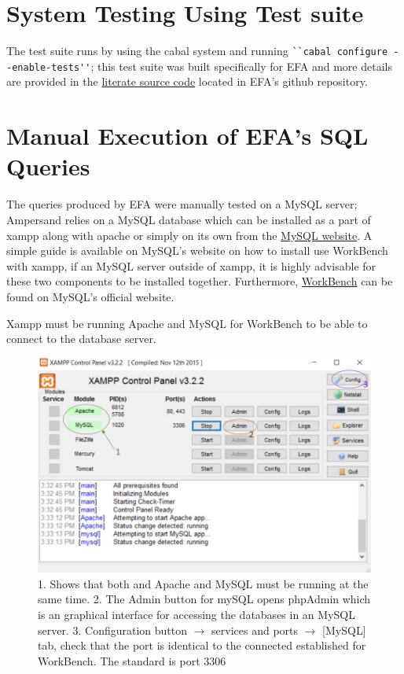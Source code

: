 \section{System Testing Using Test suite}
The test suite runs by using the cabal system and running 
\verb|``cabal configure --enable-tests''|; this test suite was built 
specifically for EFA and 
more details are provided in the 
\href{https://github.com/4ZP6Capstone2015/ampersand/blob/master/src/Database/Design/Ampersand/ECA2SQL/FreshName.lhs}{literate
 source code} located in EFA's github repository.

\section{Manual Execution of EFA's SQL Queries}

The queries produced by EFA were manually tested on a MySQL server; Ampersand 
relies on a MySQL database which can be installed as a part of xampp along with 
apache or simply on its own from the 
\href{https://dev.mysql.com/downloads/mysql/}{MySQL website}. A simple guide is 
available on MySQL's website on how to install use WorkBench with xampp, if an 
MySQL server outside of xampp, it is highly advisable for these two components 
to be installed together. Furthermore, 
\href{https://dev.mysql.com/downloads/workbench/}{WorkBench} can be found on 
MySQL's official website.

Xampp must be running Apache and MySQL for WorkBench to be able to connect to 
the database server. 
\begin{figure}[!h]
    \includegraphics[width=\textwidth]{images/xampp}
    \caption{\footnotesize{1. Shows that both and Apache and MySQL must be 
    running at the same time. 2. The Admin button for mySQL opens phpAdmin 
    which is an graphical interface for accessing the databases in an MySQL 
    server. 3. Configuration button $\rightarrow$ services and ports 
    $\rightarrow$ [MySQL] tab, check that the port is identical to the 
    connected established for WorkBench. The standard is port 3306 }}
\end{figure}

